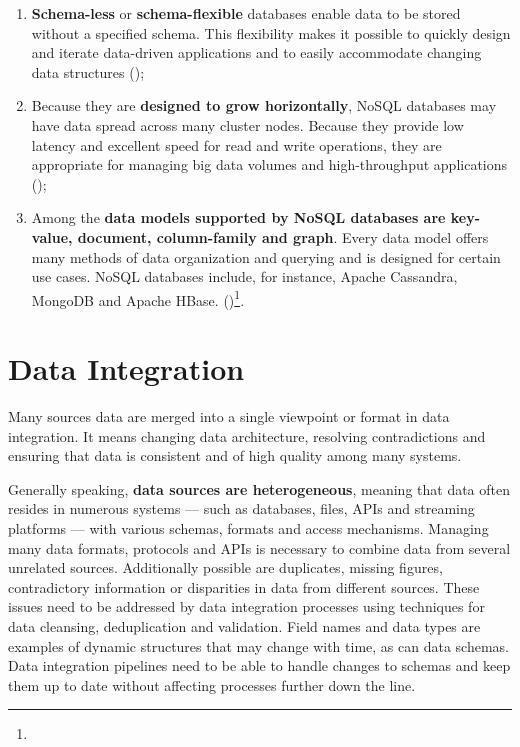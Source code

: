 \begin{enumerate}
    \item \textbf{Schema-less} or \textbf{schema-flexible} databases enable data to be stored without a specified schema. This flexibility makes it possible to quickly design and iterate data-driven applications and to easily accommodate changing data structures (\cite{Nayak2013TypeON})\footnotemark[21];
    \item Because they are \textbf{designed to grow horizontally}, NoSQL databases may have data spread across many cluster nodes. Because they provide low latency and excellent speed for read and write operations, they are appropriate for managing big data volumes and high-throughput applications (\cite{Nayak2013TypeON})\footnotemark[21];
    \item Among the \textbf{data models supported by NoSQL databases are key-value, document, column-family and graph}. Every data model offers many methods of data organization and querying and is designed for certain use cases. NoSQL databases include, for instance, Apache Cassandra, MongoDB and Apache HBase. (\cite{Nayak2013TypeON})\footnote[21]{}.
\end{enumerate}

\section{Data Integration}

Many sources data are merged into a single viewpoint or format in data integration. It means changing data architecture, resolving contradictions and ensuring that data is consistent and of high quality among many systems.

Generally speaking, \textbf{data sources are heterogeneous}, meaning that data often resides in numerous systems — such as databases, files, APIs and streaming platforms — with various schemas, formats and access mechanisms. Managing many data formats, protocols and APIs is necessary to combine data from several unrelated sources. Additionally possible are duplicates, missing figures, contradictory information or disparities in data from different sources. These issues need to be addressed by data integration processes using techniques for data cleansing, deduplication and validation. Field names and data types are examples of dynamic structures that may change with time, as can data schemas. Data integration pipelines need to be able to handle changes to schemas and keep them up to date without affecting processes further down the line.

